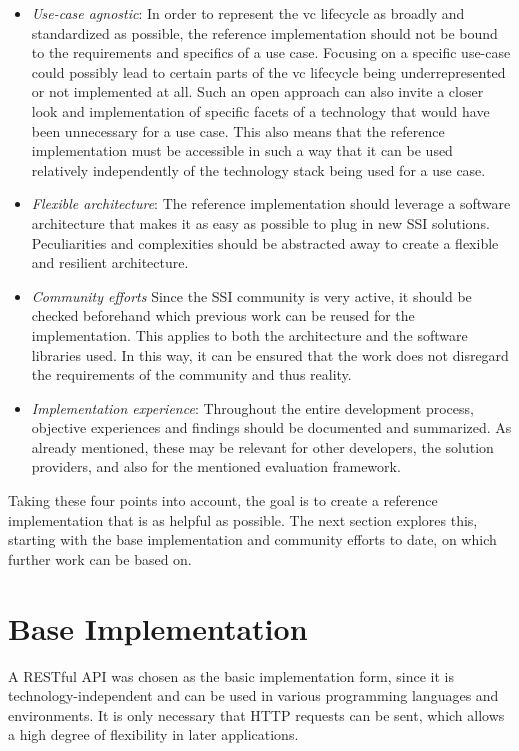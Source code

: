     \begin{itemize}
        \item \textit{Use-case agnostic}: In order to represent the \ac{vc} lifecycle as broadly and standardized as possible, the reference implementation should not be bound to the requirements and specifics of a use case. Focusing on a specific use-case could possibly lead to certain parts of the \ac{vc} lifecycle being underrepresented or not implemented at all. Such an open approach can also invite a closer look and implementation of specific facets of a technology that would have been unnecessary for a use case. This also means that the reference implementation must be accessible in such a way that it can be used relatively independently of the technology stack being used for a use case.
        \item \textit{Flexible architecture}: The reference implementation should leverage a software architecture that makes it as easy as possible to plug in new \ac{SSI} solutions. Peculiarities and complexities should be abstracted away to create a flexible and resilient architecture. 
        \item \textit{Community efforts} Since the \ac{SSI} community is very active, it should be checked beforehand which previous work can be reused for the implementation. This applies to both the architecture and the software libraries used. In this way, it can be ensured that the work does not disregard the requirements of the community and thus reality.
        \item \textit{Implementation experience}: Throughout the entire development process, objective experiences and findings should be documented and summarized. As already mentioned, these may be relevant for other developers, the solution providers, and also for the mentioned evaluation framework.
    \end{itemize}
    
    Taking these four points into account, the goal is to create a reference implementation that is as helpful as possible. The next section explores this, starting with the base implementation and community efforts to date, on which further work can be based on.
    
    \section{Base Implementation}\label{section: base-implementation}
    A RESTful API was chosen as the basic implementation form, since it is technology-independent and can be used in various programming languages and environments. It is only necessary that HTTP requests can be sent, which allows a high degree of flexibility in later applications. 
    
